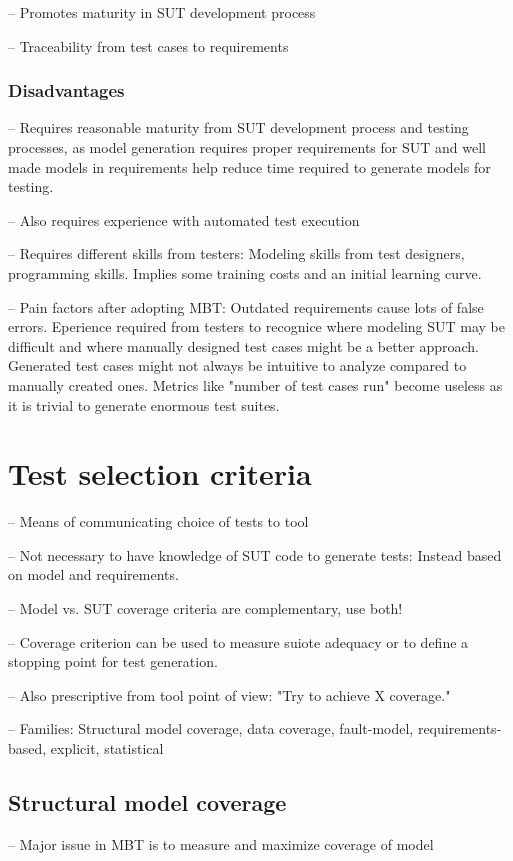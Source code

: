 -- Promotes maturity in SUT development process

-- Traceability from test cases to requirements

\subsubsection{Disadvantages}
-- Requires reasonable maturity from SUT development process and testing processes, as model generation requires proper requirements for SUT and well made models in requirements help reduce time required to generate models for testing.

-- Also requires experience with automated test execution

-- Requires different skills from testers: Modeling skills from test designers, programming skills. Implies some training costs and an initial learning curve.

-- Pain factors after adopting MBT: Outdated requirements cause lots of false errors. Eperience required from testers to recognice where modeling SUT may be difficult and where manually designed test cases might be a better approach. Generated test cases might not always be intuitive to analyze compared to manually created ones. Metrics like "number of test cases run" become useless as it is trivial to generate enormous test suites.

\section{Test selection criteria}
-- Means of communicating choice of tests to tool

-- Not necessary to have knowledge of SUT code to generate tests: Instead based on model and requirements.

-- Model vs. SUT coverage criteria are complementary, use both!

-- Coverage criterion can be used to measure suiote adequacy or to define a stopping point for test generation.

-- Also prescriptive from tool point of view: "Try to achieve X coverage."

-- Families: Structural model coverage, data coverage, fault-model, requirements-based, explicit, statistical

\subsection{Structural model coverage}
-- Major issue in MBT is to measure and maximize coverage of model

